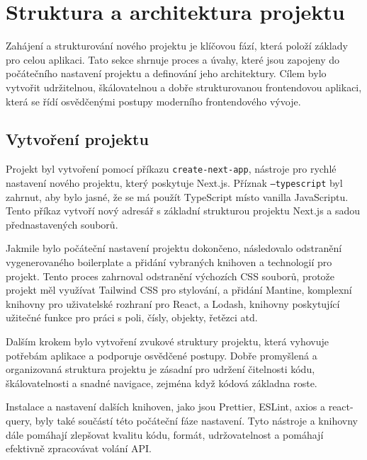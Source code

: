 \section{Struktura a architektura projektu}
\label{sec:implementace-architektura}
Zahájení a strukturování nového projektu je klíčovou fází, která položí základy pro celou aplikaci.
Tato sekce shrnuje proces a úvahy, které jsou zapojeny do počátečního nastavení projektu a definování jeho architektury.
Cílem bylo vytvořit udržitelnou, škálovatelnou a dobře strukturovanou frontendovou aplikaci, která se řídí osvědčenými postupy moderního frontendového vývoje.

\subsection{Vytvoření projektu}
\label{subsec:implementace-architektura-vytvoreni-projektu}
Projekt byl vytvoření pomocí příkazu \texttt{create-next-app}, nástroje pro rychlé nastavení nového projektu, který poskytuje Next.js.
Příznak \texttt{--typescript} byl zahrnut, aby bylo jasné, že se má použít TypeScript místo vanilla JavaScriptu.
Tento příkaz vytvoří nový adresář s základní strukturou projektu Next.js a sadou přednastavených souborů.

Jakmile bylo počáteční nastavení projektu dokončeno, následovalo odstranění vygenerovaného boilerplate a přidání vybraných knihoven a technologií pro projekt.
Tento proces zahrnoval odstranění výchozích CSS souborů, protože projekt měl využívat Tailwind CSS pro stylování, a přidání Mantine, komplexní knihovny pro uživatelské rozhraní pro React, a Lodash, knihovny poskytující užitečné funkce pro práci s poli, čísly, objekty, řetězci atd.

Dalším krokem bylo vytvoření zvukové struktury projektu, která vyhovuje potřebám aplikace a podporuje osvědčené postupy.
Dobře promyšlená a organizovaná struktura projektu je zásadní pro udržení čitelnosti kódu, škálovatelnosti a snadné navigace, zejména když kódová základna roste.

Instalace a nastavení dalších knihoven, jako jsou Prettier, ESLint, axios a react-query, byly také součástí této počáteční fáze nastavení.
Tyto nástroje a knihovny dále pomáhají zlepšovat kvalitu kódu, formát, udržovatelnost a pomáhají efektivně zpracovávat volání API\@.


